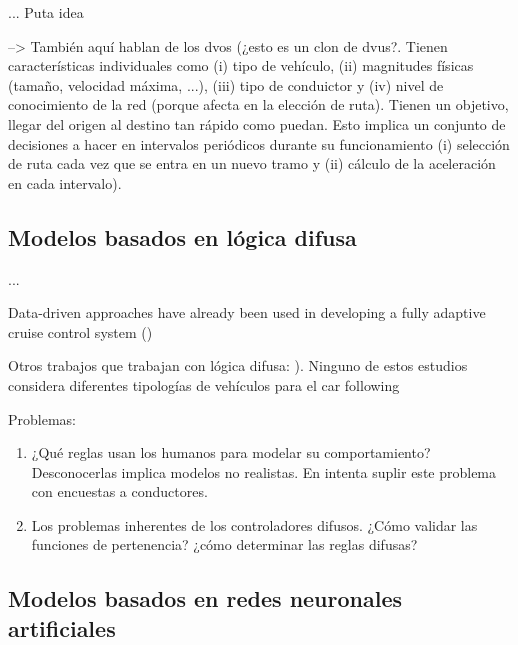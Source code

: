 

... Puta idea

\cite{Hidas2002} --> También aquí hablan de los \glspl{dvo} (¿esto es un clon de \glspl{dvu}?. Tienen características individuales como (i) tipo de vehículo, (ii) magnitudes físicas (tamaño, velocidad máxima, ...), (iii) tipo de conduictor y (iv) nivel de conocimiento de la red (porque afecta en la elección de ruta). Tienen un objetivo, llegar del origen al destino tan rápido como puedan. Esto implica un conjunto de decisiones a hacer en intervalos periódicos durante su funcionamiento (i) selección de ruta cada vez que se entra en un nuevo tramo y (ii) cálculo de la aceleración en cada intervalo).


\subsection{Modelos basados en lógica difusa}

...

Data-driven approaches have already been used in developing a fully adaptive cruise control system (\cite{Simonelli2009, Bifulco2014})

Otros trabajos que trabajan con lógica difusa: \cite{Chakroborty2003, Das1999, Gao2008, Gonzalez-Rojo2000, Gonzalez-Rojo2002a, Hatipkarasulu2002, McDonald1997, Won2007, Zheng2005, Wu2003}). Ninguno de estos estudios considera diferentes tipologías de vehículos para el car following

Problemas:

\begin{enumerate}
	\item ¿Qué reglas usan los humanos para modelar su comportamiento? Desconocerlas implica modelos no realistas. En \cite{Wu2003} intenta suplir este problema con encuestas a conductores.
	\item Los problemas inherentes de los controladores difusos. ¿Cómo validar las funciones de pertenencia? ¿cómo determinar las reglas difusas?
\end{enumerate}

\subsection{Modelos basados en redes neuronales artificiales}

\cite{zheng2013}



